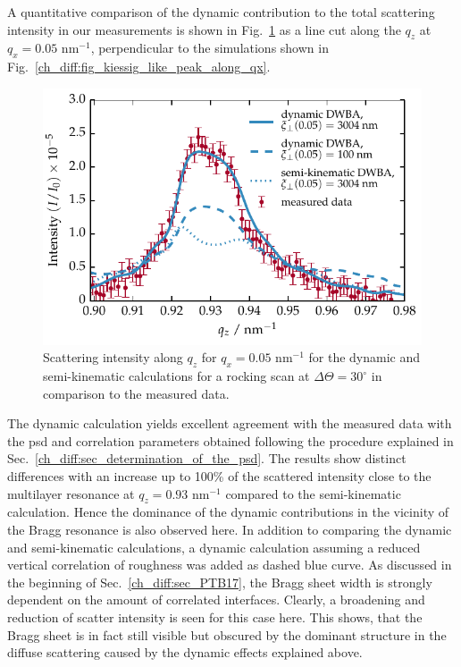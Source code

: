 A quantitative comparison of the dynamic contribution to the total scattering intensity in our measurements is shown in Fig.~\ref{fig:Comparison_full_semi} as a line cut along the $q_z$ at $q_x=0.05$ nm$^{-1}$, perpendicular to the simulations shown in Fig.~\ref{ch_diff:fig_kiessig_like_peak_along_qx}.
\begin{figure}[htbp]
        \includegraphics{img/PTB17_diffuse_qz_kinematic_vs_dynamic_100nm} \caption{Scattering intensity along $q_z$ for $q_x=0.05$ nm$^{-1}$ for the dynamic and semi-kinematic calculations for a rocking scan at $\Delta\Theta=30^\circ$ in comparison to the measured data.} \label{fig:Comparison_full_semi} 
\end{figure}
The dynamic calculation yields excellent agreement with the measured data with the \gls{psd} and correlation parameters obtained following the procedure explained in Sec.~\ref{ch_diff:sec_determination_of_the_psd}. The results show distinct differences with an increase up to 100\% of the scattered intensity close to the multilayer resonance at $q_z=0.93$ nm$^{-1}$ compared to the semi-kinematic calculation. Hence the dominance of the dynamic contributions in the vicinity of the Bragg resonance is also observed here. In addition to comparing the dynamic and semi-kinematic calculations, a dynamic calculation assuming a reduced vertical correlation of roughness was added as dashed blue curve. As discussed in the beginning of Sec.~\ref{ch_diff:sec_PTB17}, the Bragg sheet width is strongly dependent on the amount of correlated interfaces. Clearly, a broadening and reduction of scatter intensity is seen for this case here. This shows, that the Bragg sheet is in fact still visible but obscured by the dominant structure in the diffuse scattering caused by the dynamic effects explained above.

